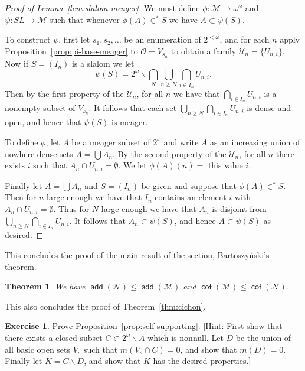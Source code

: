 \documentclass[11pt,oneside]{amsbook}
\newcommand{\Null}{\mathcal N}
\newcommand{\Meager}{\mathcal M}
\DeclareMathOperator{\add}{\mathsf{add}}
\DeclareMathOperator{\cof}{\mathsf{cof}}
\theoremstyle{definition}
\newtheorem{exerc}{Exercise}[section]
\theoremstyle{plain}
\newtheorem{theorem}{Theorem}[section]
\theoremstyle{definition}
\theoremstyle{remark}
\numberwithin{equation}{section}
\numberwithin{figure}{section}
\begin{document}
\begin{proof}[Proof of Lemma~\ref{lem:slalom-meager}]
  We must define $\phi\colon\Meager\to\omega^\omega$ and $\psi\colon SL\to\Meager$ such that whenever $\phi(A)\in^*S$ we have $A\subset\psi(S)$.

  To construct $\psi$, first let $s_1,s_2,\ldots$ be an enumeration of $2^{<\omega}$, and for each $n$ apply Proposition~\ref{prop:pi-base-meager} to $\mathcal O=V_{s_n}$ to obtain a family $\mathcal U_n=\{U_{n,i}\}$. Now if $S=(I_n)$ is a slalom we let
  \[\psi(S)=2^\omega\smallsetminus\bigcap_N\bigcup_{n\geq N}\bigcap_{i\in I_n}U_{n,i}\text{.}
  \]
  Then by the first property of the $\mathcal U_n$, for all $n$ we have that $\bigcap_{i\in I_n}U_{n,i}$ is a nonempty subset of $V_{s_n}$. It follows that each set $\bigcup_{n\geq N}\bigcap_{i\in I_n}U_{n,i}$ is dense and open, and hence that $\psi(S)$ is meager.

  To define $\phi$, let $A$ be a meager subset of $2^\omega$ and write $A$ as an increasing union of nowhere dense sets $A=\bigcup A_n$. By the second property of the $\mathcal U_n$, for all $n$ there exists $i$ such that $A_n\cap U_{n,i}=\emptyset$. We let $\phi(A)(n)=$ this value $i$.

  Finally let $A=\bigcup A_n$ and $S=(I_n)$ be given and suppose that $\phi(A)\in^*S$. Then for $n$ large enough we have that $I_n$ contains an element $i$ with $A_n\cap U_{n,i}=\emptyset$. Thus for $N$ large enough we have that $A_n$ is disjoint from $\bigcup_{n\geq N}\bigcap_{i\in I_n}U_{n,i}$. It follows that $A_n\subset\psi(S)$, and hence $A\subset\psi(S)$ as desired.
\end{proof}

This concludes the proof of the main result of the section, Bartoszy\'nski's theorem.

\begin{theorem}
  We have $\add(\Null)\leq\add(\Meager)$ and $\cof(\Meager)\leq\cof(\Null)$.
\end{theorem}

This also concludes the proof of Theorem~\ref{thm:cichon}.

\begin{exerc}
  \label{exerc:self-supporting}
  Prove Proposition~\ref{prop:self-supporting}. [Hint: First show that there exists a closed subset $C\subset2^\omega\smallsetminus A$ which is nonnull. Let $D$ be the union of all basic open sets $V_s$ such that $m(V_s\cap C)=0$, and show that $m(D)=0$. Finally let $K=C\smallsetminus D$, and show that $K$ has the desired properties.]
\end{exerc}
\end{document}
